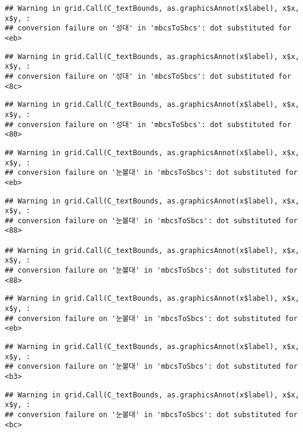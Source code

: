 \documentclass[
]{article}
\begin{document}
\begin{verbatim}
## Warning in grid.Call(C_textBounds, as.graphicsAnnot(x$label), x$x, x$y, :
## conversion failure on '성대' in 'mbcsToSbcs': dot substituted for <eb>
\end{verbatim}

\begin{verbatim}
## Warning in grid.Call(C_textBounds, as.graphicsAnnot(x$label), x$x, x$y, :
## conversion failure on '성대' in 'mbcsToSbcs': dot substituted for <8c>
\end{verbatim}

\begin{verbatim}
## Warning in grid.Call(C_textBounds, as.graphicsAnnot(x$label), x$x, x$y, :
## conversion failure on '성대' in 'mbcsToSbcs': dot substituted for <80>
\end{verbatim}

\begin{verbatim}
## Warning in grid.Call(C_textBounds, as.graphicsAnnot(x$label), x$x, x$y, :
## conversion failure on '눈볼대' in 'mbcsToSbcs': dot substituted for <eb>
\end{verbatim}

\begin{verbatim}
## Warning in grid.Call(C_textBounds, as.graphicsAnnot(x$label), x$x, x$y, :
## conversion failure on '눈볼대' in 'mbcsToSbcs': dot substituted for <88>

## Warning in grid.Call(C_textBounds, as.graphicsAnnot(x$label), x$x, x$y, :
## conversion failure on '눈볼대' in 'mbcsToSbcs': dot substituted for <88>
\end{verbatim}

\begin{verbatim}
## Warning in grid.Call(C_textBounds, as.graphicsAnnot(x$label), x$x, x$y, :
## conversion failure on '눈볼대' in 'mbcsToSbcs': dot substituted for <eb>
\end{verbatim}

\begin{verbatim}
## Warning in grid.Call(C_textBounds, as.graphicsAnnot(x$label), x$x, x$y, :
## conversion failure on '눈볼대' in 'mbcsToSbcs': dot substituted for <b3>
\end{verbatim}

\begin{verbatim}
## Warning in grid.Call(C_textBounds, as.graphicsAnnot(x$label), x$x, x$y, :
## conversion failure on '눈볼대' in 'mbcsToSbcs': dot substituted for <bc>
\end{verbatim}
\end{document}
